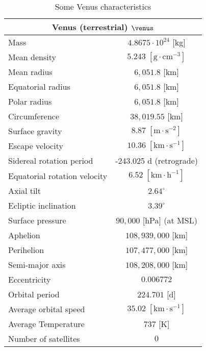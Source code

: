	\begin{table}[H]
		\centering
		\begin{tabular}{|l|c|}
		\hline
		\multicolumn{2}{|c|}{\cellcolor[HTML]{9B9B9B}\textbf{Venus (terrestrial) $\venus$}} \\ \hline
		Mass & $4.8675\cdot 10^{24}$ {[}kg{]} \\ \hline		
		Mean density & $5.243\;[\text{g}\cdot \text{cm}^{-3}]$ \\ \hline
		Mean radius & $6,051.8$ {[}km{]} \\ \hline
		Equatorial radius & $6,051.8$  {[}km{]} \\ \hline
		Polar radius & $6,051.8$ {[}km{]} \\ \hline
		Circumference & $38,019.55$ {[}km{]} \\ \hline
		Surface gravity & $8.87 \; [\text{m}\cdot \text{s}^{-2}]$ \\ \hline
		Escape velocity & $10.36 \;[\text{km}\cdot\text{s}^{-1}]$ \\ \hline
		Sidereal rotation period & -243.025 d (retrograde) \\ \hline
		Equatorial rotation velocity & $6.52\;[\text{km}\cdot\text{h}^{-1}]$ \\ \hline
		Axial tilt & $2.64^\circ$ \\ \hline
		Ecliptic inclination & $3.39^\circ$ \\ \hline
		Surface pressure & $90,000$ {[}hPa{]} (at MSL) \\ \hline
		Aphelion & $108,939,000$ {[}km{]} \\ \hline
		Perihelion & $107,477,000$ {[}km{]} \\ \hline
		Semi-major axis & $108,208,000$ {[}km{]} \\ \hline
		Eccentricity & $0.006772$ \\ \hline
		Orbital period & $224.701$ {[}d{]} \\ \hline
		Average orbital speed & $35.02\;[\text{km}\cdot\text{s}^{-1}]$ \\ \hline
		Average Temperature & $737$ {[}K{]} \\ \hline
		Number of satellites & $0$ \\ \hline
		\end{tabular}
		\caption{Some Venus characteristics}
	\end{table}
	
